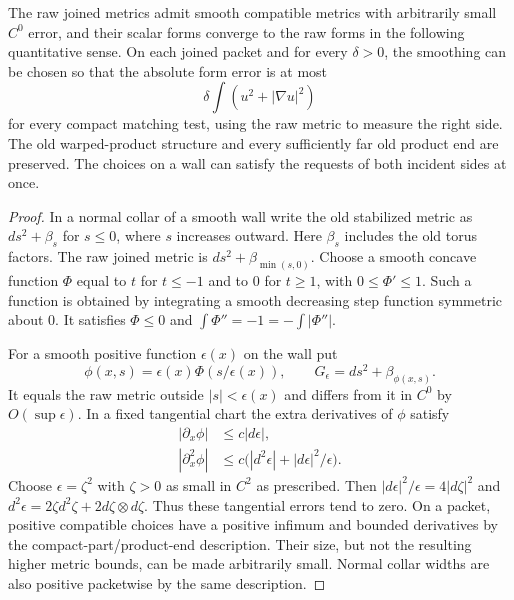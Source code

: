 \begin{lemma}\label{regular:seam}
The raw joined metrics admit smooth compatible metrics with arbitrarily
small $C^0$ error, and their scalar forms converge to the raw forms in
the following quantitative sense.  On each joined packet and for every
$\delta>0$, the smoothing can be chosen so that the absolute form
error is at most
\[
 \delta\int(u^2+|\nabla u|^2)
\]
for every compact matching test, using the raw metric to measure the
right side.  The old warped-product structure and every sufficiently
far old product end are preserved.  The choices on a wall can satisfy
the requests of both incident sides at once.
\end{lemma}

\begin{proof}
In a normal collar of a smooth wall write the old stabilized metric
as $ds^2+\beta_s$ for $s\le0$, where $s$ increases outward.  Here
$\beta_s$ includes the old torus factors.  The raw joined metric is
$ds^2+\beta_{\min(s,0)}$.  Choose a smooth concave function $\Phi$
equal to $t$ for $t\le-1$ and to $0$ for $t\ge1$, with
$0\le\Phi'\le1$.  Such a function is obtained by integrating a smooth
decreasing step function symmetric about $0$.  It satisfies
$\Phi\le0$ and $\int\Phi''=-1= -\int|\Phi''|$.

For a smooth positive function $\epsilon(x)$ on the wall put
\[
 \phi(x,s)=\epsilon(x)\Phi(s/\epsilon(x)),\qquad
 G_\epsilon=ds^2+\beta_{\phi(x,s)}.
\]
It equals the raw metric outside $|s|<\epsilon(x)$ and differs from it
in $C^0$ by $O(\sup\epsilon)$.  In a fixed tangential chart the extra
derivatives of $\phi$ satisfy
\begin{align*}
 |\partial_x\phi|&\le c|d\epsilon|,\\
 |\partial_x^2\phi|&\le
 c\bigl(|d^2\epsilon|+|d\epsilon|^2/\epsilon\bigr).
\end{align*}
Choose $\epsilon=\zeta^2$ with $\zeta>0$ as small in $C^2$ as
prescribed.  Then $|d\epsilon|^2/\epsilon=4|d\zeta|^2$ and
$d^2\epsilon=2\zeta d^2\zeta+2d\zeta\otimes d\zeta$.
Thus these tangential errors tend to zero.  On a packet, positive
compatible choices have a positive infimum and bounded derivatives by
the compact-part/product-end description.  Their size, but not the
resulting higher metric bounds, can be made arbitrarily small.  Normal
collar widths are also positive packetwise by the same description.


\end{proof}
